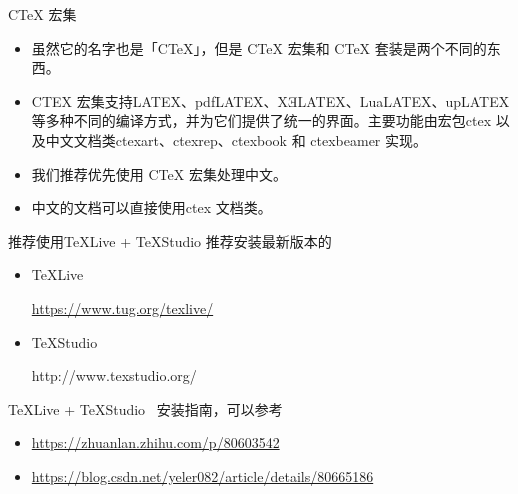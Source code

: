 \documentclass[13pt,fontset=mac]{ctexbeamer}
\begin{document}
\begin{frame}
{CTeX 宏集}
\begin{itemize}
	\item 
虽然它的名字也是「CTeX」，但是 CTeX 宏集和 CTeX 套装是两个不同的东西。
\item  CTEX 宏集支持LATEX、pdfLATEX、XƎLATEX、LuaLATEX、upLATEX 等多种不同的编译方式，并为它们提供了统一的界面。主要功能由宏包ctex 以及中文文档类ctexart、ctexrep、ctexbook 和 ctexbeamer 实现。
\item 我们推荐\alert{优先使用 CTeX 宏集处理中文}。
\item 中文的文档可以直接使用ctex 文档类。
\end{itemize}

 
\end{frame}


\begin{frame}{推荐使用TeXLive + TeXStudio }
	推荐安装最新版本的
	
	\begin{itemize}
		\item TeXLive 
		
		\href{https://www.tug.org/texlive/}{https://www.tug.org/texlive/}
		
		
		
		\item TeXStudio
		
		http://www.texstudio.org/
	\end{itemize}
	
	TeXLive + TeXStudio  ~安装指南，可以参考
	\begin{itemize}
		\item 	\href{https://zhuanlan.zhihu.com/p/80603542}{https://zhuanlan.zhihu.com/p/80603542}
		\item \href{https://blog.csdn.net/yeler082/article/details/80665186}{https://blog.csdn.net/yeler082/article/details/80665186}
	\end{itemize}
\end{frame}
\end{document}
